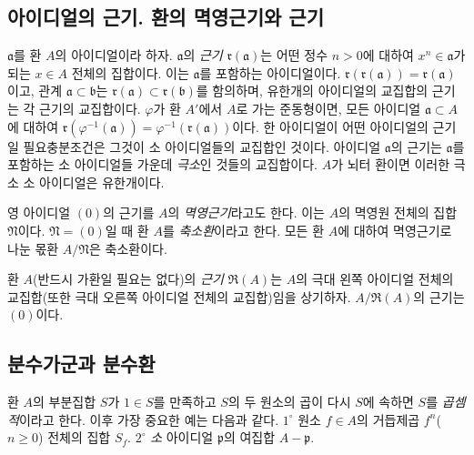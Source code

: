 \subsection{아이디얼의 근기. 환의 멱영근기와 근기}
\label{subsection:0.1.1-ko}

\begin{env}[1.1.1]
\label{0.1.1.1-ko}
$\mathfrak{a}$를 환 $A$의 아이디얼이라 하자. $\mathfrak{a}$의 \emph{근기} $\mathfrak{r}(\mathfrak{a})$는 어떤 정수 $n>0$에 대하여 $x^n\in\mathfrak{a}$가 되는 $x\in A$ 전체의 집합이다. 이는 $\mathfrak{a}$를 포함하는 아이디얼이다.
$\mathfrak{r}(\mathfrak{r}(\mathfrak{a}))=\mathfrak{r}(\mathfrak{a})$이고, 관계 $\mathfrak{a}\subset\mathfrak{b}$는 $\mathfrak{r}(\mathfrak{a})\subset\mathfrak{r}(\mathfrak{b})$를 함의하며, 유한개의 아이디얼의 교집합의 근기는 각 근기의 교집합이다.
$\varphi$가 환 $A'$에서 $A$로 가는 준동형이면, 모든 아이디얼 $\mathfrak{a}\subset A$에 대하여 $\mathfrak{r}(\varphi^{-1}(\mathfrak{a}))=\varphi^{-1}(\mathfrak{r}(\mathfrak{a}))$이다.
한 아이디얼이 어떤 아이디얼의 근기일 필요충분조건은 그것이 소 아이디얼들의 교집합인 것이다.
아이디얼 $\mathfrak{a}$의 근기는 $\mathfrak{a}$를 포함하는 소 아이디얼들 가운데 \emph{극소}인 것들의 교집합이다. $A$가 뇌터 환이면 이러한 극소 소 아이디얼은 유한개이다.

영 아이디얼 $(0)$의 근기를 $A$의 \emph{멱영근기}라고도 한다. 이는 $A$의 멱영원 전체의 집합 $\mathfrak{N}$이다.
$\mathfrak{N}=(0)$일 때 환 $A$를 \emph{축소환}이라고 한다. 모든 환 $A$에 대하여 멱영근기로 나눈 몫환 $A/\mathfrak{N}$은 축소환이다.
\end{env}

\begin{env}[1.1.2]
\label{0.1.1.2-ko}
환 $A$(반드시 가환일 필요는 없다)의 \emph{근기} $\mathfrak{R}(A)$는 $A$의 극대 왼쪽 아이디얼 전체의 교집합(또한 극대 오른쪽 아이디얼 전체의 교집합)임을 상기하자.
$A/\mathfrak{R}(A)$의 근기는 $(0)$이다.
\end{env}

\subsection{분수가군과 분수환}
\label{subsection:0.1.2-ko}

\begin{env}[1.2.1]
\label{0.1.2.1-ko}
환 $A$의 부분집합 $S$가 $1\in S$를 만족하고 $S$의 두 원소의 곱이 다시 $S$에 속하면 $S$를 \emph{곱셈적}이라고 한다.
이후 가장 중요한 예는 다음과 같다. $1^\circ$ 원소 $f\in A$의 거듭제곱 $f^n$($n\geq 0$) 전체의 집합 $S_f$. $2^\circ$ \emph{소} 아이디얼 $\mathfrak{p}$의 여집합 $A-\mathfrak{p}$.
\end{env}

